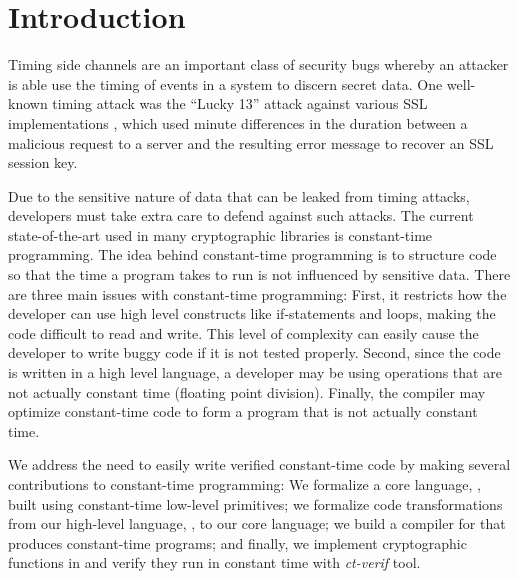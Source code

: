 \section{Introduction}

Timing side channels are an important class of security bugs whereby an attacker
is able use the timing of events in a system to discern secret data. One well-known
timing attack was the ``Lucky 13'' attack against various SSL implementations \cite{al2013lucky},
which used minute differences in the duration between a malicious request to a server and
the resulting error message to recover an SSL session key.

Due to the sensitive nature of data that can be leaked from timing attacks, developers
must take extra care to defend against such attacks. The current state-of-the-art
used in many cryptographic libraries is constant-time programming. The idea behind
constant-time programming is to structure code so that the time a program
takes to run is not influenced by sensitive data. There are three main issues
with constant-time programming: First, it restricts how the developer
can use high level constructs like if-statements and loops, making the code
difficult to read and write. This level of complexity can easily cause the
developer to write buggy code if it is not tested properly. Second,
since the code is written in a high level language, a developer may be using operations
that are not actually constant time (\eg floating point division).
Finally, the compiler may optimize constant-time code to form a program
that is not actually constant time.

We address the need to easily write verified constant-time code by making several
contributions to constant-time programming: We formalize a core
language, \ccore, built using constant-time low-level primitives;
we formalize code transformations from our high-level language,
\constc, to our core language; we build a compiler for
\constc that produces constant-time programs; and finally, we implement
cryptographic functions in \constc and verify they run in constant time with
\emph{ct-verif} tool\cite{almeida2016}.




